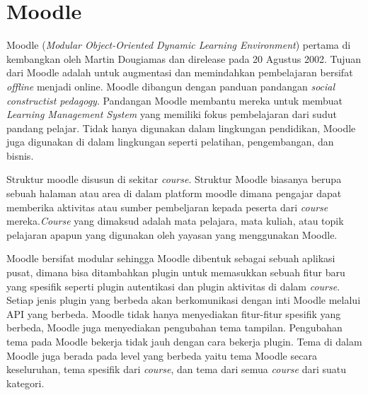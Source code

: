 \section{Moodle}
\label{sec:Moodle}

Moodle (\textit{Modular Object-Oriented Dynamic Learning Environment}\cite{moodle:name}) pertama di kembangkan oleh Martin Dougiamas dan direlease pada 20 Agustus 2002\cite{moodle:release}. Tujuan dari Moodle adalah untuk augmentasi dan memindahkan pembelajaran bersifat \textit{offline} menjadi {online}. Moodle dibangun dengan panduan pandangan \textit{social constructist pedagogy}\cite{moodle:phil}. Pandangan Moodle membantu mereka untuk membuat \textit{ Learning Management System} yang memiliki fokus pembelajaran dari sudut pandang pelajar. Tidak hanya digunakan dalam lingkungan pendidikan, Moodle juga digunakan di dalam lingkungan seperti pelatihan, pengembangan, dan bisnis.

Struktur moodle disusun di sekitar \textit{course}. Struktur Moodle biasanya berupa sebuah halaman atau area di dalam platform moodle dimana pengajar dapat memberika aktivitas atau sumber pembeljaran kepada peserta dari \textit{course} mereka.\textit{Course} yang dimaksud adalah mata pelajara, mata kuliah, atau topik pelajaran apapun yang digunakan oleh yayasan yang menggunakan Moodle. 

Moodle bersifat modular sehingga Moodle dibentuk sebagai sebuah aplikasi pusat, dimana bisa ditambahkan plugin untuk memasukkan sebuah fitur baru yang spesifik seperti plugin autentikasi dan plugin aktivitas di dalam \textit{course}. Setiap jenis plugin yang berbeda akan berkomunikasi dengan inti Moodle melalui API yang berbeda. Moodle tidak hanya menyediakan fitur-fitur spesifik yang berbeda, Moodle juga menyediakan pengubahan tema tampilan. Pengubahan tema pada Moodle bekerja tidak jauh dengan cara bekerja plugin. Tema di dalam Moodle juga berada pada level yang berbeda yaitu tema Moodle secara keseluruhan, tema spesifik dari \textit{course}, dan tema dari semua \textit{course} dari suatu kategori. \cite{moodle:architecture}

